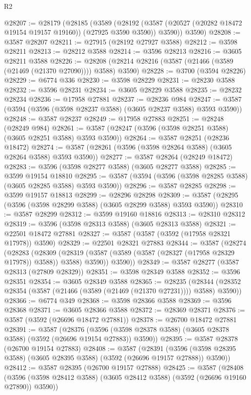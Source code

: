 \begin{lexlean}{R2}
\begin{coremodule}
@28207 := @28179
    (@28185
      (@3589
        (@28192 (@3587 (@20527 (@20282 @18472 @19154 @19157 @19160)) (@27925 @3590 @3590)) @3590))
      @3590)
@28208 := @3587 @28207
@28211 := @27915 (@28192 @27927 @3588)
@28212 := @3598 @28211
@28213 := @28212 @3588
@28214 := @3596 @28213
@28216 := @3605 @28211 @3588
@28226 := @28208 (@28214 @28216 (@3587 (@21466 (@3589 (@21469 (@21370 @27090)))) @3588) @3590)
@28228 := @3700 (@3594 @28226)
@28229 := @6774 @336
@28230 := @3598 @28229
@28231 := @28230 @3588
@28232 := @3596 @28231
@28234 := @3605 @28229 @3588
@28235 := @28232 @28234
@28236 := @17958 @27881
@28237 := @28236 @984
@28247 := @3587 (@3594 (@3596 (@3598 @28237 @3588) (@3605 @28237 @3588) @3593 @3590))
@28248 := @3587 @28237
@28249 := @17958 @27883
@28251 := @28248 (@28249 @984)
@28261 := @3587 (@28247 (@3596 (@3598 @28251 @3588) (@3605 @28251 @3588) @3593 @3590))
@28264 := @3587 @28251 (@28236 @18472)
@28274 := @3587 (@28261 (@3596 (@3598 @28264 @3588) (@3605 @28264 @3588) @3593 @3590))
@28277 := @3587 @28264 (@28249 @18472)
@28283 := @3596 (@3598 @28277 @3588) (@3605 @28277 @3588)
@28285 := @3599 @19154 @18810
@28295 := @3587 (@3594 (@3596 (@3598 @28285 @3588) (@3605 @28285 @3588) @3593 @3590))
@28296 := @3587 @28285
@28298 := @3599 @19157 @18813
@28299 := @28296 @28298
@28309 := @3587 (@28295 (@3596 (@3598 @28299 @3588) (@3605 @28299 @3588) @3593 @3590))
@28310 := @3587 @28299
@28312 := @3599 @19160 @18816
@28313 := @28310 @28312
@28319 := @3596 (@3598 @28313 @3588) (@3605 @28313 @3588)
@28321 := @22501 @18472 @27881
@28327 := @3587 (@3587 (@3592 (@17958 @28321 @17978)) @3590)
@28329 := @22501 @28321 @27883
@28344 := @3587
    (@28274
      (@28283
        (@28309 (@28319 (@3587 (@3589 (@3587 (@28327 (@17958 @28329 @17978)) @3588)) @3588) @3590))
        @3590))
@28349 := @3587 @28277 (@3587 @28313 (@27809 @28329))
@28351 := @3598 @28349 @3588
@28352 := @3596 @28351
@28354 := @3605 @28349 @3588
@28365 := @28235
    (@28344 (@28352 @28354 (@3587 (@21466 (@3589 (@21469 (@21370 @27231)))) @3588) @3590))
@28366 := @6774 @349
@28368 := @3598 @28366 @3588
@28369 := @3596 @28368
@28371 := @3605 @28366 @3588
@28372 := @28369 @28371
@28376 := @3587 (@3592 (@26696 @18472 @27881))
@28378 := @26700 @18472 @27881
@28391 := @3587
    (@28376 (@3596 (@3598 @28378 @3588) (@3605 @28378 @3588) (@3592 (@26696 @19154 @27883)) @3590))
@28395 := @3587 @28378 (@26700 @19154 @27883)
@28408 := @3587
    (@28391 (@3596 (@3598 @28395 @3588) (@3605 @28395 @3588) (@3592 (@26696 @19157 @27888)) @3590))
@28412 := @3587 @28395 (@26700 @19157 @27888)
@28425 := @3587
    (@28408 (@3596 (@3598 @28412 @3588) (@3605 @28412 @3588) (@3592 (@26696 @19160 @27890)) @3590))

\end{coremodule}
\end{lexlean}
